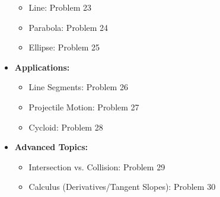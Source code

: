 \documentclass{article}
\begin{document}
\begin{itemize}
\begin{itemize}
            \item Line: Problem 23
            \item Parabola: Problem 24
            \item Ellipse: Problem 25
        \end{itemize}
    \item \textbf{Applications:}
        \begin{itemize}
            \item Line Segments: Problem 26
            \item Projectile Motion: Problem 27
            \item Cycloid: Problem 28
        \end{itemize}
    \item \textbf{Advanced Topics:}
        \begin{itemize}
            \item Intersection vs. Collision: Problem 29
            \item Calculus (Derivatives/Tangent Slopes): Problem 30
        \end{itemize}
\end{itemize}
\end{document}
